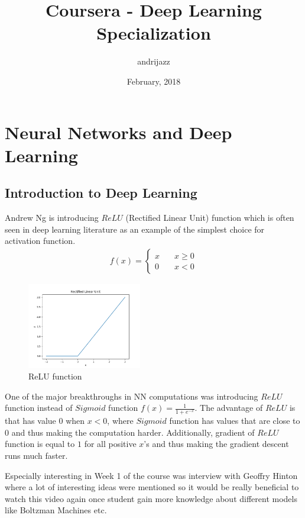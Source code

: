 \documentclass[a4paper]{report}
\title{Coursera - Deep Learning Specialization}
\date{February, 2018}
\author{andrijazz}
\newcommand{\insertcode}[2]{\begin{itemize}\item[]\end{itemize}} %
\begin{document}
\maketitle

\chapter{Neural Networks and Deep Learning}

\section{Introduction to Deep Learning}
Andrew Ng is introducing $ReLU$ (Rectified Linear Unit) function which is often seen in deep learning literature as an example of the simplest choice for activation function. 
\begin{align}
f(x) =
	\begin{cases}
		x   & \quad x \geq 0\\
		0	& \quad x < 0
	\end{cases}
\end{align}

\begin{figure}[!h]
	\centering
	\includegraphics[width=50mm]{../plots/relu.png}
	\caption{ReLU function}
	\label{fig:relu}
\end{figure}

One of the major breakthroughs in NN computations was introducing $ReLU$ function instead of $Sigmoid$ function $f(x) = \frac{1}{1 + e ^{-x}}$. The advantage of $ReLU$ is that has value $0$ when $x < 0$, where $Sigmoid$ function has values that are close to $0$ and thus making the computation harder.
Additionally, gradient of $ReLU$ function is equal to $1$ for all positive $x$'s and thus making the gradient descent runs much faster.

Especially interesting in Week 1 of the course was interview with Geoffry Hinton where a lot of interesting ideas were mentioned so it would be really beneficial to watch this video again once student gain more knowledge about different models like Boltzman Machines etc.
\end{document}
